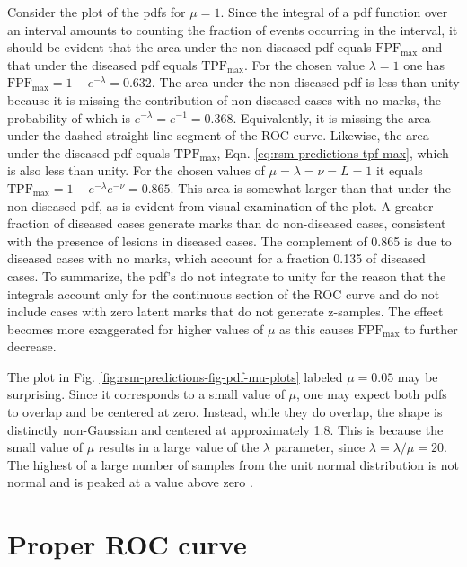 \documentclass[
]{book}
\begin{document}
Consider the plot of the pdfs for \(\mu = 1\). Since the integral of a pdf function over an interval amounts to counting the fraction of events occurring in the interval, it should be evident that the area under the non-diseased pdf equals \(\text{FPF}_{\text{max}}\) and that under the diseased pdf equals \(\text{TPF}_{\text{max}}\). For the chosen value \(\lambda = 1\) one has \(\text{FPF}_{\text{max}} = 1 - e^{-\lambda} = 0.632\). The area under the non-diseased pdf is less than unity because it is missing the contribution of non-diseased cases with no marks, the probability of which is \(e^{-\lambda} = e^{-1} = 0.368\). Equivalently, it is missing the area under the dashed straight line segment of the ROC curve. Likewise, the area under the diseased pdf equals \(\text{TPF}_{\text{max}}\), Eqn. \eqref{eq:rsm-predictions-tpf-max}, which is also less than unity. For the chosen values of \(\mu = \lambda = \nu = L = 1\) it equals \(\text{TPF}_{\text{max}} = 1 - e^{-\lambda} e^{-\nu} = 0.865\). This area is somewhat larger than that under the non-diseased pdf, as is evident from visual examination of the plot. A greater fraction of diseased cases generate marks than do non-diseased cases, consistent with the presence of lesions in diseased cases. The complement of 0.865 is due to diseased cases with no marks, which account for a fraction 0.135 of diseased cases. To summarize, the pdf's do not integrate to unity for the reason that the integrals account only for the continuous section of the ROC curve and do not include cases with zero latent marks that do not generate z-samples. The effect becomes more exaggerated for higher values of \(\mu\) as this causes \(\text{FPF}_{\text{max}}\) to further decrease.

The plot in Fig. \ref{fig:rsm-predictions-fig-pdf-mu-plots} labeled \(\mu = 0.05\) may be surprising. Since it corresponds to a small value of \(\mu\), one may expect both pdfs to overlap and be centered at zero. Instead, while they do overlap, the shape is distinctly non-Gaussian and centered at approximately 1.8. This is because the small value of \(\mu\) results in a large value of the \(\lambda\) parameter, since \(\lambda = \lambda / \mu = 20\). The highest of a large number of samples from the unit normal distribution is not normal and is peaked at a value above zero \citep{fisher1928limiting}.

\hypertarget{rsm-predictions-roc-curve-proper}{%
\section{Proper ROC curve}\label{rsm-predictions-roc-curve-proper}}
\end{document}

